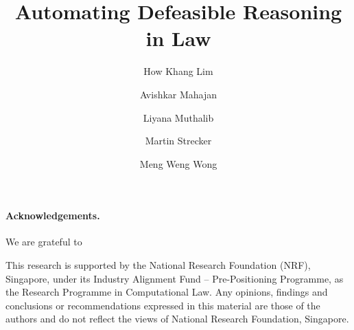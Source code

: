 \documentclass[runningheads]{llncs}
\begin{document}
\title{Automating Defeasible Reasoning in Law}

\author{How Khang Lim\and
  Avishkar Mahajan \and
  Liyana Muthalib \and
  Martin Strecker \and
  Meng Weng Wong
  }
\maketitle

\begin{abstract}

\end{abstract}















\paragraph{Acknowledgements.}
We are grateful to  

This research is supported by the National Research Foundation (NRF),
Singapore, under its Industry Alignment Fund – Pre-Positioning Programme, as
the Research Programme in Computational Law. Any opinions, findings and
conclusions or recommendations expressed in this material are those of the
authors and do not reflect the views of National Research Foundation,
Singapore.






\newpage
\appendix



\end{document}
